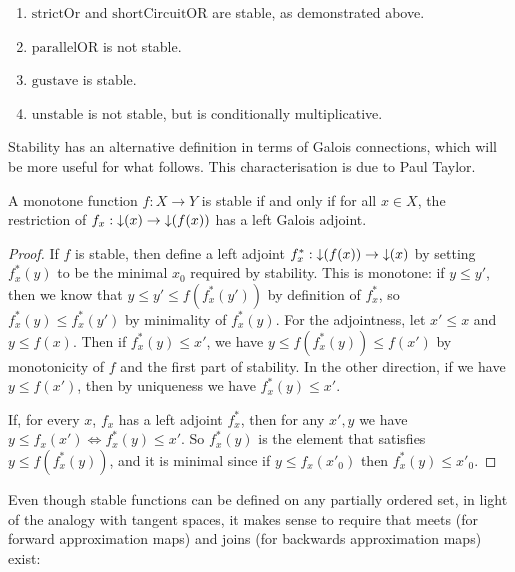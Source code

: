 \begin{example}
  \begin{enumerate}
  \item $\mathrm{strictOr}$ and $\mathrm{shortCircuitOR}$ are stable, as demonstrated above.
  \item $\mathrm{parallelOR}$ is not stable.
  \item $\mathrm{gustave}$ is stable.
  \item $\mathrm{unstable}$ is not stable, but is conditionally multiplicative.
  \end{enumerate}
\end{example}

Stability has an alternative definition in terms of Galois connections, which will be more useful for what follows. This characterisation is due to Paul Taylor.

\begin{lemma}
  A monotone function $f : X \to Y$ is stable if and only if for all
  $x \in X$, the restriction of $f_x : \mathop{\downarrow}(x) \to \mathop{\downarrow}(f(x))$
  has a left Galois adjoint.
\end{lemma}

\begin{proof}
  If $f$ is stable, then define a left adjoint
  $f^*_x : \mathop{\downarrow}(f(x)) \to \mathop{\downarrow}(x)$ by setting $f^*_x(y)$ to be
  the minimal $x_0$ required by stability. This is monotone: if
  $y \leq y'$, then we know that $y \leq y' \leq f(f^*_x(y'))$ by
  definition of $f^*_x$, so $f^*_x(y) \leq f^*_x(y')$ by minimality of
  $f^*_x(y)$. For the adjointness, let $x' \leq x$ and $y \leq
  f(x)$. Then if $f^*_x(y) \leq x'$, we have
  $y \leq f(f^*_x(y)) \leq f(x')$ by monotonicity of $f$ and the first
  part of stability. In the other direction, if we have
  $y \leq f(x')$, then by uniqueness we have $f^*_x(y) \leq x'$.

  If, for every $x$, $f_x$ has a left adjoint $f^*_x$, then for any
  $x', y$ we have $y \leq f_x(x') \Leftrightarrow f^*_x(y) \leq
  x'$. So $f^*_x(y)$ is the element that satisfies
  $y \leq f(f^*_x(y))$, and it is minimal since if $y \leq f_x(x'_0)$
  then $f^*_x(y) \leq x'_0$.
\end{proof}

Even though stable functions can be defined on any partially ordered set, in light of the analogy with tangent spaces, it makes sense to require that meets (for forward approximation maps) and joins (for backwards approximation maps) exist:

